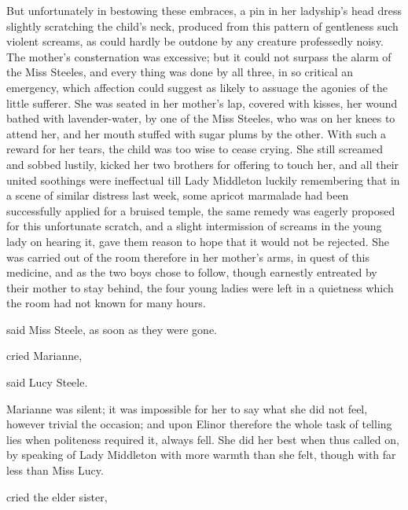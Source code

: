 But unfortunately in bestowing these embraces, a pin in her ladyship's head dress slightly scratching the child's neck, produced from this pattern of gentleness such violent screams, as could hardly be outdone by any creature professedly noisy. The mother's consternation was excessive; but it could not surpass the alarm of the Miss Steeles, and every thing was done by all three, in so critical an emergency, which affection could suggest as likely to assuage the agonies of the little sufferer. She was seated in her mother's lap, covered with kisses, her wound bathed with lavender-water, by one of the Miss Steeles, who was on her knees to attend her, and her mouth stuffed with sugar plums by the other. With such a reward for her tears, the child was too wise to cease crying. She still screamed and sobbed lustily, kicked her two brothers for offering to touch her, and all their united soothings were ineffectual till Lady Middleton luckily remembering that in a scene of similar distress last week, some apricot marmalade had been successfully applied for a bruised temple, the same remedy was eagerly proposed for this unfortunate scratch, and a slight intermission of screams in the young lady on hearing it, gave them reason to hope that it would not be rejected. She was carried out of the room therefore in her mother's arms, in quest of this medicine, and as the two boys chose to follow, though earnestly entreated by their mother to stay behind, the four young ladies were left in a quietness which the room had not known for many hours.

 said Miss Steele, as soon as they were gone. 

 cried Marianne, 

 said Lucy Steele.

Marianne was silent; it was impossible for her to say what she did not feel, however trivial the occasion; and upon Elinor therefore the whole task of telling lies when politeness required it, always fell. She did her best when thus called on, by speaking of Lady Middleton with more warmth than she felt, though with far less than Miss Lucy.

 cried the elder sister, 

